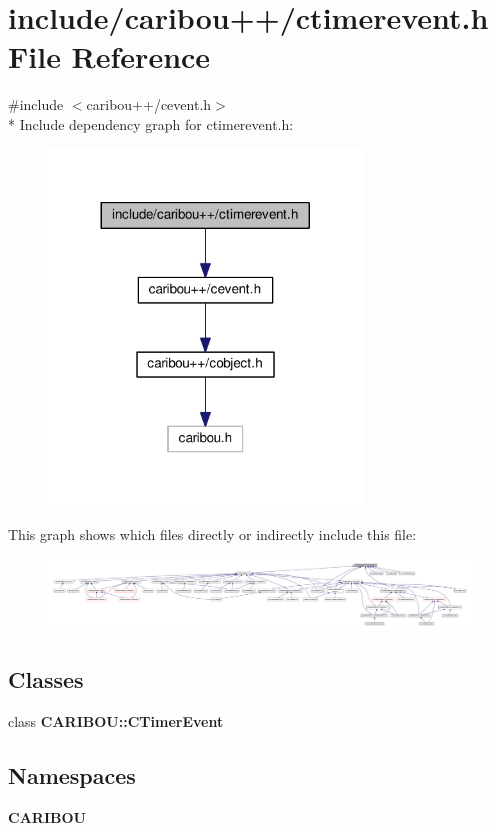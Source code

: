 \section{include/caribou++/ctimerevent.h File Reference}
\label{ctimerevent_8h}
{\ttfamily \#include $<$caribou++/cevent.\-h$>$}\\*
Include dependency graph for ctimerevent.\-h\-:\nopagebreak
\begin{figure}[H]
\begin{center}
\leavevmode
\includegraphics[width=236pt]{ctimerevent_8h__incl}
\end{center}
\end{figure}
This graph shows which files directly or indirectly include this file\-:\nopagebreak
\begin{figure}[H]
\begin{center}
\leavevmode
\includegraphics[width=350pt]{ctimerevent_8h__dep__incl}
\end{center}
\end{figure}
\subsection*{Classes}
\begin{DoxyCompactItemize}
\item 
class {\bf C\-A\-R\-I\-B\-O\-U\-::\-C\-Timer\-Event}
\end{DoxyCompactItemize}
\subsection*{Namespaces}
\begin{DoxyCompactItemize}
\item 
{\bf C\-A\-R\-I\-B\-O\-U}
\end{DoxyCompactItemize}
